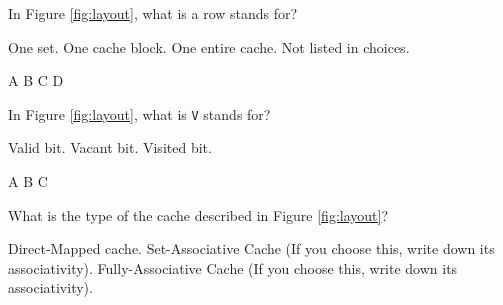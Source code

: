 \begin{questions}

\question[2] In Figure \ref{fig:layout}, what is a row stands for?
{

    \begin{oneparchoices}
        \choice One set.
        \choice One cache block.
        \choice One entire cache.
        \choice Not listed in choices.
    \end{oneparchoices}
    
    \begin{solution}
        \begin{oneparcheckboxes}
            \choice A
            \choice B
            \choice C
            \choice D
        \end{oneparcheckboxes}
    \end{solution}

}

\question[2] In Figure \ref{fig:layout}, what is \texttt{V} stands
for?
{

    \begin{oneparchoices}
        \choice Valid bit.
        \choice Vacant bit.
        \choice Visited bit.
    \end{oneparchoices}
    
    \begin{solution}
        \begin{oneparcheckboxes}
            \choice A
            \choice B
            \choice C
        \end{oneparcheckboxes}
    \end{solution}

}

\question[2] What is the type of the cache described in Figure \ref{fig:layout}?
{

    \begin{choices}
        \choice Direct-Mapped cache.
        \choice Set-Associative Cache (If you choose this, write
        down its associativity).
        \choice Fully-Associative Cache (If you choose this, write
        down its associativity).
    \end{choices}
    
}
\end{questions}
